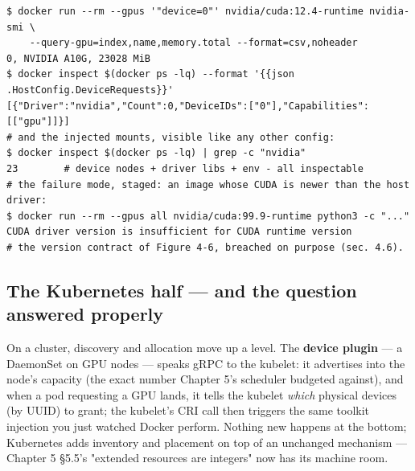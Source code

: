 \begin{terminalbox}
\begin{Verbatim}[breaklines=true,breakanywhere=true,fontsize=\small,formatcom=\color{tbbtermfg},codes=\tbbcodeactive]
$ docker run --rm --gpus '"device=0"' nvidia/cuda:12.4-runtime nvidia-smi \
    --query-gpu=index,name,memory.total --format=csv,noheader
0, NVIDIA A10G, 23028 MiB
$ docker inspect $(docker ps -lq) --format '{{json .HostConfig.DeviceRequests}}'
[{"Driver":"nvidia","Count":0,"DeviceIDs":["0"],"Capabilities":[["gpu"]]}]
# and the injected mounts, visible like any other config:
$ docker inspect $(docker ps -lq) | grep -c "nvidia"
23        # device nodes + driver libs + env - all inspectable
# the failure mode, staged: an image whose CUDA is newer than the host driver:
$ docker run --rm --gpus all nvidia/cuda:99.9-runtime python3 -c "..."
CUDA driver version is insufficient for CUDA runtime version
# the version contract of Figure 4-6, breached on purpose (sec. 4.6).
\end{Verbatim}
\end{terminalbox}

\subsection*{The Kubernetes half — and the question answered properly}

On a cluster, discovery and allocation move up a level. The \textbf{device plugin} — a DaemonSet on GPU nodes — speaks gRPC to the kubelet: it advertises  into the node's capacity (the exact number Chapter 5's scheduler budgeted against), and when a pod requesting a GPU lands, it tells the kubelet \textit{which} physical devices (by UUID) to grant; the kubelet's CRI call then triggers the same toolkit injection you just watched Docker perform. Nothing new happens at the bottom; Kubernetes adds inventory and placement on top of an unchanged mechanism — Chapter 5 §5.5's "extended resources are integers" now has its machine room.

